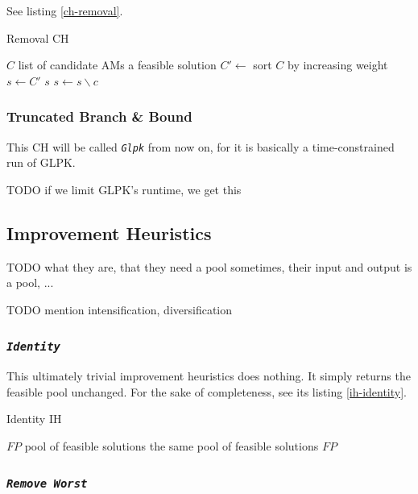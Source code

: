 \documentclass[a4paper,12pt,oneside]{report}
\newcommand{\jmodule}[1]{\texttt{\textit{#1}}}
\theoremstyle{definition}
\begin{document}
See listing \ref{ch-removal}.

\begin{algorithm}
\caption{Removal CH}
\label{ch-removal}
\begin{algorithmic}
\REQUIRE $C$ list of candidate AMs
\ENSURE a feasible solution
\STATE $C' \gets $ sort $C$ by increasing weight
\STATE $s \gets C'$
    \RETURN $s$
  \ENDIF
  \STATE $s \gets s \backslash c$
\ENDFOR
\end{algorithmic}
\end{algorithm}

\subsubsection{Truncated Branch \& Bound}

This CH will be called \jmodule{Glpk} from now on, for it is basically a time-constrained run of GLPK.

TODO if we limit GLPK's runtime, we get this 

\subsection{Improvement Heuristics}


TODO what they are, that they need a pool sometimes, their input and output is a pool, ...

TODO mention intensification, diversification

\subsubsection{\jmodule{Identity}}

This ultimately trivial improvement heuristics does nothing. It simply returns the feasible pool unchanged. For the sake of completeness, see its listing \ref{ih-identity}.

\begin{algorithm}
\caption{Identity IH}
\label{ih-identity}
\begin{algorithmic}
\REQUIRE $FP$ pool of feasible solutions
\ENSURE the same pool of feasible solutions
\RETURN $FP$
\end{algorithmic}
\end{algorithm}

\subsubsection{\jmodule{Remove Worst}}
\end{document}
